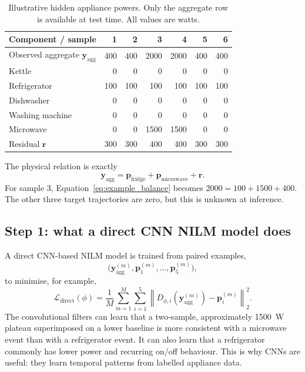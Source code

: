 \documentclass[11pt]{article}
\newcommand{\vect}[1]{\mathbf{#1}}
\newcommand{\norm}[1]{\left\lVert #1 \right\rVert}
\begin{document}
\begin{table}[ht]
\centering
\caption{Illustrative hidden appliance powers. Only the aggregate row is available at test time. All values are watts.}
\label{tab:example_truth}
\begin{tabular}{lrrrrrr}
\toprule
Component / sample & 1 & 2 & 3 & 4 & 5 & 6 \\
\midrule
Observed aggregate $\vect{y}_{\mathrm{agg}}$ & 400 & 400 & 2000 & 2000 & 400 & 400 \\
\midrule
Kettle & 0 & 0 & 0 & 0 & 0 & 0 \\
Refrigerator & 100 & 100 & 100 & 100 & 100 & 100 \\
Dishwasher & 0 & 0 & 0 & 0 & 0 & 0 \\
Washing machine & 0 & 0 & 0 & 0 & 0 & 0 \\
Microwave & 0 & 0 & 1500 & 1500 & 0 & 0 \\
Residual $\vect{r}$ & 300 & 300 & 400 & 400 & 300 & 300 \\
\bottomrule
\end{tabular}
\end{table}

The physical relation is exactly
\begin{equation}
    \vect{y}_{\mathrm{agg}}
    =\vect{p}_{\mathrm{fridge}}+
    \vect{p}_{\mathrm{microwave}}+
    \vect{r}.
    \label{eq:example_balance}
\end{equation}
For sample 3, Equation~\eqref{eq:example_balance} becomes $2000=100+1500+400$. The other three target trajectories are zero, but this is unknown at inference.

\subsection{Step 1: what a direct CNN NILM model does}

A direct CNN-based NILM model is trained from paired examples,
\begin{equation}
    \bigl(\vect{y}_{\mathrm{agg}}^{(m)},
    \vect{p}_{1}^{(m)},\ldots,\vect{p}_{5}^{(m)}\bigr),
\end{equation}
to minimise, for example,
\begin{equation}
    \mathcal{L}_{\mathrm{direct}}(\phi)=
    \frac{1}{M}\sum_{m=1}^{M}\sum_{i=1}^{5}
    \norm{D_{\phi,i}(\vect{y}_{\mathrm{agg}}^{(m)})-
    \vect{p}_{i}^{(m)}}_2^2.
    \label{eq:direct_training_example}
\end{equation}
The convolutional filters can learn that a two-sample, approximately 1500~W plateau superimposed on a lower baseline is more consistent with a microwave event than with a refrigerator event. It can also learn that a refrigerator commonly has lower power and recurring on/off behaviour. This is why CNNs are useful: they learn temporal patterns from labelled appliance data.
\end{document}
